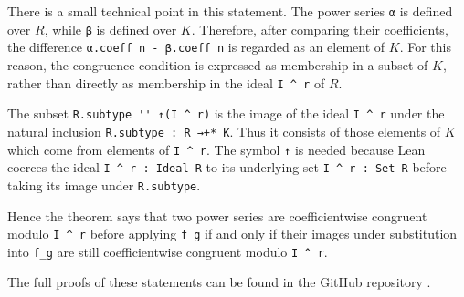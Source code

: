 There is a small technical point in this statement.  The power series
\lstinline|α| is defined over $R$, while \lstinline|β| is defined over
$K$.  Therefore, after comparing their coefficients, the difference
\lstinline|α.coeff n - β.coeff n| is regarded as an element of $K$.
For this reason, the congruence condition is expressed as membership in a
subset of $K$, rather than directly as membership in the ideal
\lstinline|I ^ r| of $R$.

The subset \lstinline|R.subtype '' ↑(I ^ r)|
is the image of the ideal \lstinline|I ^ r| under the natural inclusion
\lstinline|R.subtype : R →+* K|.  Thus it consists of those elements of
$K$ which come from elements of \lstinline|I ^ r|.  The symbol
\lstinline|↑| is needed because Lean coerces the ideal
\lstinline|I ^ r : Ideal R| to its underlying set \lstinline|I ^ r : Set R|
before taking its image under
\lstinline|R.subtype|.

Hence the theorem says that two power series are coefficientwise
congruent modulo \lstinline|I ^ r| before applying \lstinline|f_g| if and
only if their images under substitution into \lstinline|f_g| are still
coefficientwise congruent modulo \lstinline|I ^ r|.

The full proofs of these statements can be found in the GitHub
repository \href{https://github.com/WenrongZou/FormalGroupLaws/blob/main/FormalGroupLaws/IntegralityLem.lean}{\faExternalLink}.





